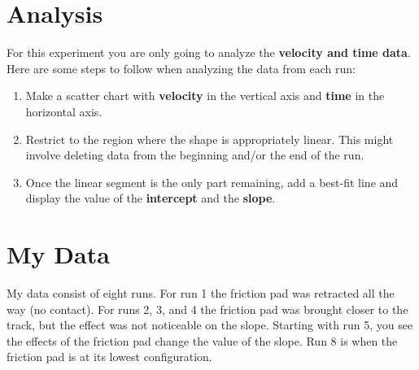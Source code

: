 \section{Analysis}
%
For this experiment you are only going to analyze the \textbf{velocity and time data}. Here are some steps to follow when analyzing the data from each run:
\begin{enumerate}
    \item Make a scatter chart with \textbf{velocity} in the vertical axis and \textbf{time} in the horizontal axis.
    \item Restrict to the region where the shape is appropriately linear. This might involve deleting data from the beginning and/or the end of the run.
    \item Once the linear segment is the only part remaining, add a best-fit line and display the value of the \textbf{intercept} and the \textbf{slope}.
\end{enumerate}
%
\section{My Data}
%
My data consist of eight runs. For run 1 the friction pad was retracted all the way (no contact). For runs 2, 3, and 4 the friction pad was brought closer to the track, but the effect was not noticeable on the slope. Starting with run 5, you see the effects of the friction pad change the value of the slope. Run 8 is when the friction pad is at its lowest configuration.
%
